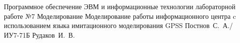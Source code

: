 \documentclass{bmstu}
\begin{document}
	
	{Программное обеспечение ЭВМ и информационные технологии}
	{лабораторной работе №7}
	{Моделирование}
	{Моделирование работы информационного центра c использованием языка имитационного моделирования GPSS}
	{}
	{Постнов~С.~А./ИУ7-71Б}
	{Рудаков~И.~В.}
	
	\maketableofcontents
	
	
	
	
	
\end{document}
